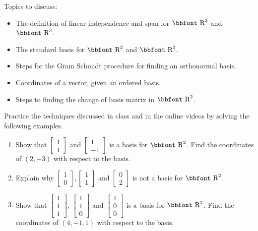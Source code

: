 \documentclass[10pt]{book}
\theoremstyle{definition}
\theoremstyle{remark}
\newcommand{\bbR}{\mathbb{R}}
\def\bbR{\mbox{\bbfont R}}
\begin{document}
\begin{large}
\noindent
Topics to discuss:
\begin{itemize}
\item The definition of linear independence and span for $\bbR^{2}$ and $\bbR^{3}$.
\item The standard basis for $\bbR^{2}$ and $\bbR^{3}$.
\item Steps for the Gram Schmidt procedure for finding an orthonormal basis. 
\item Coordinates of a vector, given an ordered basis. 
\item Steps to finding the change of basis matrix in $\bbR^{2}$.
\end{itemize}
\newpage

\noindent
Practice the techniques discussed in class and in the online videos by solving the following examples. 
\begin{enumerate}
\item Show that $\begin{bmatrix} 1 \\ 1 \end{bmatrix}$ and $\begin{bmatrix}1 \\ -1 \end{bmatrix}$ is a basis for $\bbR^2$. Find the coordinates of $(2,-3)$ with respect to the basis.\vfil\vfil 
\item Explain why $\begin{bmatrix} 1 \\ 0 \end{bmatrix}, \begin{bmatrix} 1 \\ 1 \end{bmatrix}$ and $\begin{bmatrix}0 \\ 2 \end{bmatrix}$ is not a basis for $\bbR^2$.\vfil
\newpage 

\item Show that $\begin{bmatrix} 1 \\ 1\\1 \end{bmatrix}$, $\begin{bmatrix} 1 \\ 1\\0 \end{bmatrix}$ and $\begin{bmatrix}1 \\ 0\\0 \end{bmatrix}$ is a basis for $\bbR^3$. Find the coordinates of $(4,-1,1)$ with respect to the basis.\vfil\vfil 
\newpage


\end{enumerate}
\end{large}
\end{document}
